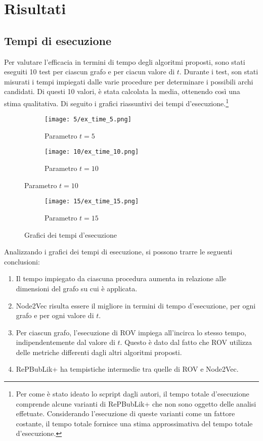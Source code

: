 \section{Risultati}
\subsection{Tempi di esecuzione}
Per valutare l'efficacia in termini di tempo degli algoritmi proposti, sono stati eseguiti 10 test per ciascun grafo e per ciacun valore di $t$.
Durante i test, son stati misurati i tempi impiegati dalle varie procedure per determinare i possibili archi candidati. 
Di questi 10 valori, è stata calcolata la media, ottenendo così una stima qualitativa.
Di seguito i grafici riassuntivi dei tempi d'esecuzione.\footnote{Per come è stato ideato lo scpript dagli autori, il tempo totale d'esecuzione comprende alcune varianti di RePBubLik+ 
che non sono oggetto delle analisi effetuate. Considerando l'esecuzione di queste varianti come un fattore costante, il tempo totale 
fornisce una stima approssimativa del tempo totale d'esecuzione.}
\begin{figure}[!h]
    \centering
\begin{subfigure}[h]{0.55\columnwidth}
    \centering
    \texttt{[image: 5/ex\_time\_5.png]}
    \caption{Parametro $t=5$}\label{fig:mate_e_5}
\end{subfigure}
\begin{subfigure}[h]{0.55\columnwidth}
    \centering
    \texttt{[image: 10/ex\_time\_10.png]}
    \caption{Parametro $t=10$}\label{fig:mihi_e_10}
\end{subfigure}
   
\end{figure}
\begin{figure}
\ContinuedFloat
\centering
\begin{subfigure}[h]{0.55\columnwidth}
    \centering
    \texttt{[image: 15/ex\_time\_15.png]}
    \caption{Parametro $t=15$}\label{fig:maas_e_15}
\end{subfigure}
\caption{Grafici dei tempi d'esecuzione}
\end{figure}
\newpage
Analizzando i grafici dei tempi di esecuzione, si possono trarre le seguenti conclusioni:
\begin{enumerate}
    \item Il tempo impiegato da ciascuna procedura aumenta in relazione alle dimensioni del grafo su cui è applicata.
    \item Node2Vec risulta essere il migliore in termini di tempo d'esecuzione, per ogni grafo e per ogni valore di $t$.
    \item Per ciascun grafo, l'esecuzione di ROV impiega all'incirca lo stesso tempo, indipendentemente dal valore di $t$. 
            Questo è dato dal fatto che ROV utilizza delle metriche differenti dagli altri algoritmi proposti.
    \item RePBubLik+ ha tempistiche intermedie tra quelle di ROV e Node2Vec.
\end{enumerate}
